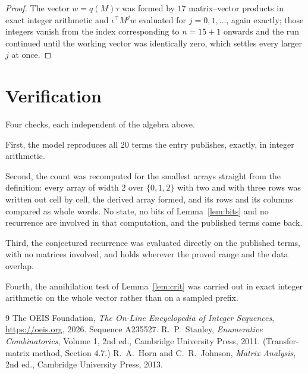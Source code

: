 \documentclass[11pt,a4paper]{article}
\theoremstyle{plain}
\theoremstyle{definition}
\begin{document}
\begin{proof}
The vector $w=q(M)\tau$ was formed by $17$ matrix--vector products in exact integer
arithmetic and $\iota^{\!\top}M^{j}w$ evaluated for $j=0,1,\dots$, again exactly; those
integers vanish from the index corresponding to $n=15+1$ onwards and the run continued
until the working vector was identically zero, which settles every larger $j$ at once.
\end{proof}

\section{Verification}

Four checks, each independent of the algebra above.

First, the model reproduces all $20$ terms the entry publishes, exactly, in integer
arithmetic.

Second, the count was recomputed for the smallest arrays straight from the definition: every
array of width $2$ over $\{0,1,2\}$ with two and with three rows was written out cell by cell,
the derived array formed, and its rows and its columns compared as whole words. No state, no
bits of Lemma~\ref{lem:bits} and no recurrence are involved in that computation, and the
published terms came back.

Third, the conjectured recurrence was evaluated directly on the published terms, with no
matrices involved, and holds wherever the proved range and the data overlap.

Fourth, the annihilation test of Lemma~\ref{lem:crit} was carried out in exact integer
arithmetic on the whole vector rather than on a sampled prefix.

\begin{thebibliography}{9}
 The OEIS Foundation, \emph{The On-Line Encyclopedia of Integer
Sequences}, \url{https://oeis.org}, 2026. Sequence A235527.
 R.~P.~Stanley, \emph{Enumerative Combinatorics}, Volume 1, 2nd ed.,
Cambridge University Press, 2011. (Transfer-matrix method, Section 4.7.)
 R.~A.~Horn and C.~R.~Johnson, \emph{Matrix Analysis}, 2nd ed., Cambridge
University Press, 2013.
\end{thebibliography}
\end{document}
